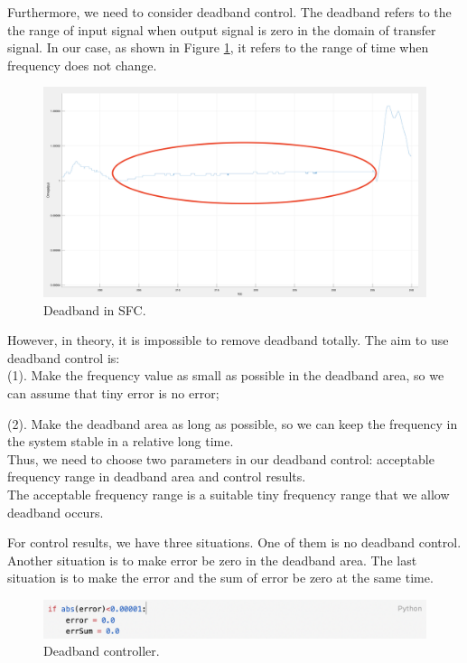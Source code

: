 \documentclass{report}
\begin{document}
Furthermore, we need to consider deadband control. The deadband refers to the the range of input signal when output signal is zero in the domain of transfer signal. In our case, as shown in Figure \textcolor{red}{\ref{3_3_deadband}}, it refers to the range of time when frequency does not change. \\

\begin{figure}[htbp]
\centering
\includegraphics[width = .999\textwidth]{figure/3_3_deadband.png}
\caption{Deadband in SFC.}
\label{3_3_deadband}
\end{figure}


However, in theory, it is impossible to remove deadband totally. The aim to use deadband control is:\\
	
    (1). Make the frequency value as small as possible in the deadband area, so we can assume that tiny error is no error;
    
	(2). Make the deadband area as long as possible, so we can keep the frequency in the system stable in a relative long time. \\

Thus, we need to choose two parameters in our deadband control: acceptable frequency range in deadband area and control results.\\

The acceptable frequency range is a suitable tiny frequency range that we allow deadband occurs. 

For control results, we have three situations. One of them is no deadband control. Another situation is to make error be zero in the deadband area. The last situation is to make the error and the sum of error be zero at the same time. \\

\begin{figure}[htbp]
\centering
\includegraphics[width = .999\textwidth]{figure/3_3_deadband_code.png}
\caption{Deadband controller.}
\label{3_3_deadband_code}
\end{figure}
\end{document}
